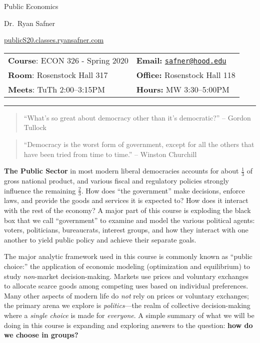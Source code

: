 \documentclass{article}
\begin{document}
\sffamily

\centerline{\Huge Public Economics}

\vspace{3 mm}

\centerline{\large Dr.~Ryan Safner}
\vspace{2 mm}
\centerline{\large \href{http://publicS20.classes.ryansafner.com}{publicS20.classes.ryansafner.com}}

\vspace{5 mm}

\begin{tabular}{@{}p{3.5in}p{3.5in}}           
\textbf{Course}: ECON 326 - Spring 2020  & \textbf{Email:}  \href{mailto:safner@hood.edu}{\nolinkurl{safner@hood.edu}}\\
\textbf{Room}: Rosenstock Hall 317 & \textbf{Office:}  Rosenstock Hall 118\\
\textbf{Meets}: TuTh 2:00--3:15PM & \textbf{Hours:} MW 3:30--5:00PM\\ 
\end{tabular}

\vspace{5 mm}

\hrule


\begin{quote}
``What's so great about democracy other than it's democratic?'' --
Gordon Tullock
\end{quote}

\begin{quote}
``Democracy is the worst form of government, except for all the others
that have been tried from time to time.'' -- Winston Churchill
\end{quote}

\textbf{The Public Sector} in most modern liberal democracies accounts
for about \(\frac{1}{3}\) of gross national product, and various fiscal
and regulatory policies strongly influence the remaining
\(\frac{2}{3}\). How does ``the government'' make decisions, enforce
laws, and provide the goods and services it is expected to? How does it
interact with the rest of the economy? A major part of this course is
exploding the black box that we call ``government'' to examine and model
the various political agents: voters, politicians, bureaucrats, interest
groups, and how they interact with one another to yield public policy
and achieve their separate goals.

The major analytic framework used in this course is commonly known as
``public choice:'' the application of economic modeling (optimization
and equilibrium) to study \emph{non}-market decision-making. Markets use
prices and voluntary exchanges to allocate scarce goods among competing
uses based on individual preferences. Many other aspects of modern life
do \emph{not} rely on prices or voluntary exchanges; the primary arena
we explore is \emph{politics}---the realm of collective decision-making
where a \emph{single choice} is made for \emph{everyone}. A simple
summary of what we will be doing in this course is expanding and
exploring answers to the question: \textbf{how do we choose in groups?}
\end{document}
